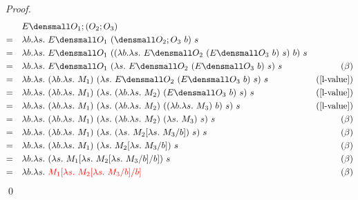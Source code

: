 \begin{proof}
        \begin{align*}
            &\quad E\den{O_1;(O_2;O_3)} \\
            =& \quad \lambda b. \lambda s.~ E\den{O_1} ~(\den{O_2;O_3} ~b) ~s \\
            =& \quad \lambda b. \lambda s.~ E\den{O_1} ~((\lambda b. \lambda s.~ E\den{O_2} ~(E\den{O_3} ~b) ~s) ~b) ~s \\
            =& \quad \lambda b. \lambda s.~ E\den{O_1} ~(\lambda s.~ E\den{O_2} ~(E\den{O_3} ~b) ~s) ~s & (\beta) \\
            =& \quad \lambda b. \lambda s.~ (\lambda b. \lambda s.~ M_1) ~(\lambda s.~ E\den{O_2} ~(E\den{O_3} ~b) ~s) ~s & (\cref{l-value})\\
            =& \quad \lambda b. \lambda s.~ (\lambda b. \lambda s.~ M_1) ~(\lambda s.~ (\lambda b. \lambda s.~ M_2) ~(E\den{O_3} ~b) ~s) ~s & (\cref{l-value})\\
            =& \quad \lambda b. \lambda s.~ (\lambda b. \lambda s.~ M_1) ~(\lambda s.~ (\lambda b. \lambda s.~ M_2) ~((\lambda b. \lambda s.~ M_3) ~b) ~s) ~s & (\cref{l-value})\\
            =& \quad \lambda b. \lambda s.~ (\lambda b. \lambda s.~ M_1) ~(\lambda s.~ (\lambda b. \lambda s.~ M_2) ~(\lambda s.~ M_3) ~s) ~s & (\beta)\\
            =& \quad \lambda b. \lambda s.~ (\lambda b. \lambda s.~ M_1) ~(\lambda s.~ (\lambda s.~ M_2\subst{b}{\lambda s.~ M_3}) ~s) ~s & (\beta)\\
            =& \quad \lambda b. \lambda s.~ (\lambda b. \lambda s.~ M_1) ~(\lambda s.~ M_2\subst{b}{\lambda s.~ M_3}) ~s & (\beta)\\
            =& \quad \lambda b. \lambda s.~ (\lambda s.~ M_1\subst{b}{\lambda s.~ M_2\subst{b}{\lambda s.~ M_3}}) ~s & (\beta)\\
            =& \quad \lambda b. \lambda s.~ \color{red}{M_1\subst{b}{\lambda s.~ M_2\subst{b}{\lambda s.~ M_3}}} & (\beta)
        \end{align*}
        \qed
    \end{proof}

